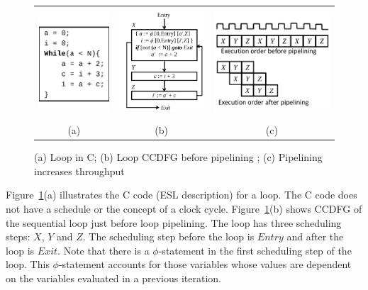 \begin{figure}
\begin{center}
\begin{tabular}{ccc}
\includegraphics[height=1.6in]{fig-proposal/C-code}
&
\includegraphics[height=1.6in]{fig-proposal/seq-ccdfg-1}
&
\includegraphics[height=1.6in]{fig-proposal/pp-clock-cycles}
\\
(a) & (b) & (c)
\end{tabular}
\end{center}
\caption{(a) Loop in C; (b) Loop CCDFG before pipelining ; (c) Pipelining increases throughput}
\label{fig:high-level-synthesis}
\end{figure}

Figure~\ref{fig:high-level-synthesis}(a) illustrates the C
code (ESL description) for a loop.  The C code does not have
a schedule or the concept of a clock cycle.
Figure~\ref{fig:high-level-synthesis}(b) shows CCDFG of the
sequential loop just before loop pipelining. The loop has
three scheduling steps: $X$, $Y$ and $Z$.  The scheduling
step before the loop is $Entry$ and after the loop is
$Exit$. Note that there is a $\phi$-statement in the
first scheduling step of the loop.  This $\phi$-statement
accounts for those variables whose values are dependent on
the variables evaluated in a previous iteration.

